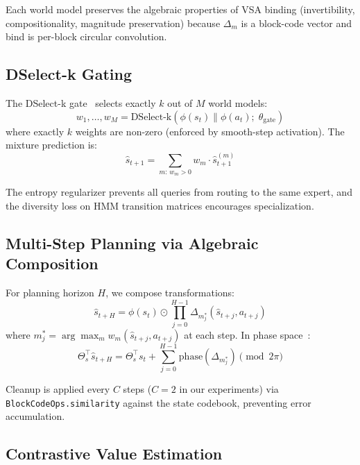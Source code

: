 \documentclass[journal]{IEEEtai}
\begin{document}
Each world model preserves the algebraic properties of VSA binding (invertibility, compositionality, magnitude preservation) because $\Delta_m$ is a block-code vector and bind is per-block circular convolution.

\subsection{DSelect-k Gating}

The DSelect-k gate~\cite{hazimeh2021dselect} selects exactly $k$ out of $M$ world models:
\begin{equation}
w_1, \ldots, w_M = \mathrm{DSelect\text{-}k}(\phi(s_t) \| \phi(a_t);\; \theta_\mathrm{gate})
\end{equation}
where exactly $k$ weights are non-zero (enforced by smooth-step activation). The mixture prediction is:
\begin{equation}
\hat{s}_{t+1} = \sum_{m:\, w_m > 0} w_m \cdot \hat{s}_{t+1}^{(m)}
\end{equation}

The entropy regularizer prevents all queries from routing to the same expert, and the diversity loss on HMM transition matrices encourages specialization.

\subsection{Multi-Step Planning via Algebraic Composition}

For planning horizon $H$, we compose transformations:
\begin{equation}
\hat{s}_{t+H} = \phi(s_t) \odot \prod_{j=0}^{H-1} \Delta_{m^*_j}(\hat{s}_{t+j}, a_{t+j})
\end{equation}
where $m^*_j = \arg\max_m w_m(\hat{s}_{t+j}, a_{t+j})$ at each step. In phase space~\cite{chung2025geometric}:
\begin{equation}
\Theta_s^\top \hat{s}_{t+H} = \Theta_s^\top s_t + \sum_{j=0}^{H-1} \mathrm{phase}(\Delta_{m^*_j}) \pmod{2\pi}
\end{equation}

Cleanup is applied every $C$ steps ($C=2$ in our experiments) via \texttt{BlockCodeOps.similarity} against the state codebook, preventing error accumulation.

\subsection{Contrastive Value Estimation}
\end{document}
